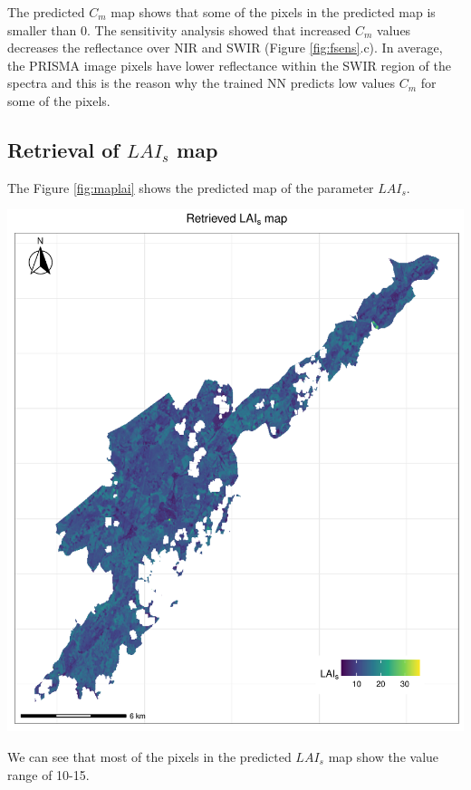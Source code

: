 \documentclass[a4paper, twoside]{templates/ociamthesis}
\let\origfigure\figure
\let\endorigfigure\endfigure
\renewenvironment{figure}[1][2] {
    \expandafter\origfigure\expandafter[H]
} {
    \endorigfigure
}
\begin{document}
The predicted \(C_{m}\) map shows that some of the pixels in the predicted map is smaller than 0. The sensitivity analysis showed that increased \(C_{m}\) values decreases the reflectance over NIR and SWIR (Figure \ref{fig:fsens}.c). In average, the PRISMA image pixels have lower reflectance within the SWIR region of the spectra and this is the reason why the trained NN predicts low values \(C_{m}\) for some of the pixels.

\hypertarget{retrieval-of-lai_s-map}{%
\subsection{\texorpdfstring{Retrieval of \(LAI_{s}\) map}{Retrieval of LAI\_\{s\} map}}\label{retrieval-of-lai_s-map}}

The Figure \ref{fig:maplai} shows the predicted map of the parameter \(LAI_{s}\).

\begin{figure}
\includegraphics[width=0.9\linewidth]{./figures/lais_map} \caption{Predicted map of the parameter $LAI_{s}$}\label{fig:maplai}
\end{figure}

We can see that most of the pixels in the predicted \(LAI_{s}\) map show the value range of 10-15.
\end{document}
